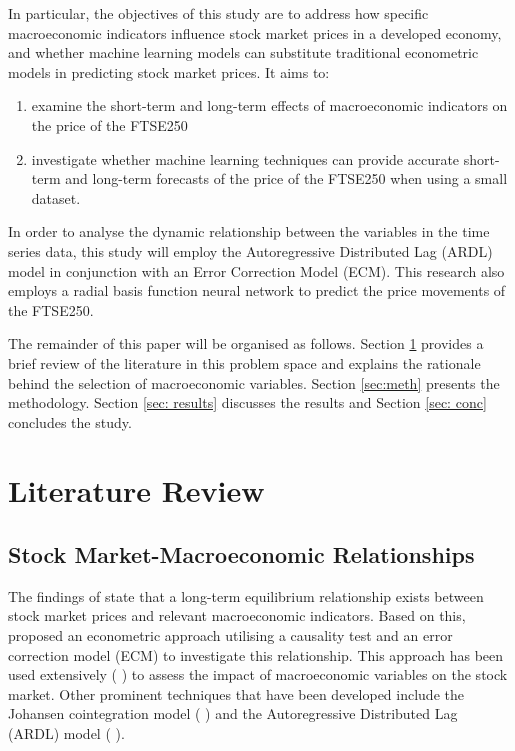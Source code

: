 \documentclass[11pt,a4paper]{article}
\newcommand{\citeboth}[1]{\citeauthor{#1} \citep{#1}}
\begin{document}
In particular, the objectives of this study are to address how specific macroeconomic indicators influence stock market prices in a developed economy, and whether machine learning models can substitute traditional econometric models in predicting stock market prices. It aims to:
\begin{enumerate}
    \item examine the short-term and long-term effects of macroeconomic indicators on the price of the FTSE250
    \item investigate whether machine learning techniques can provide accurate short-term and long-term forecasts of the price of the FTSE250 when using a small dataset.
\end{enumerate}

In order to analyse the dynamic relationship between the variables in the time series data, this study
will employ the Autoregressive Distributed Lag (ARDL) model in conjunction with an Error
Correction Model (ECM). This research also employs a radial basis function neural network to predict the price movements of the FTSE250.

The remainder of this paper will be organised as follows. 
Section \ref{sec:lit} provides a brief review of the literature in this problem space and explains the rationale behind the selection of macroeconomic variables.
Section \ref{sec:meth} presents the methodology. Section \ref{sec: results} discusses the results and Section \ref{sec: conc} concludes
the study.

\section{Literature Review}
\label{sec:lit}

\subsection{Stock Market-Macroeconomic Relationships}

The findings of \citeboth{ChenRollRoss1986} state that a long-term equilibrium relationship 
exists between stock market prices and relevant macroeconomic indicators. Based on this, 
\citeboth{EngleGranger1987} proposed an econometric approach utilising a causality test and an 
error correction model (ECM) to investigate this relationship. This approach has been used extensively (\citeboth{QuadriMasih, Plíhal2016,olomu2015}) to assess the impact of macroeconomic variables on the stock market. 
Other prominent techniques that have been developed include the Johansen cointegration model (\citeboth{YadavKheraMishra2021,Ozcan2012,ChistiShakeelGanai2020}) and the Autoregressive Distributed Lag (ARDL) model (\citeboth{khan2018,demir2019,neifar2023}).
\end{document}
